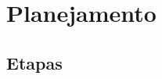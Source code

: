 \documentclass[10pt,twoside,a4paper]{article}
\begin{document}
\section{Planejamento}
\doublespacing
\subsection{Etapas}
\end{document}
